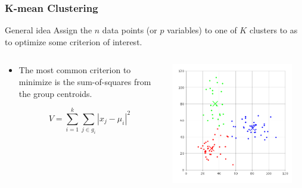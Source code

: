 \documentclass{beamer}
\begin{document}
\begin{frame}
\frametitle{K-mean Clustering}

\begin{block}{General idea}
Assign the $n$ data points (or $p$ variables) to one of $K$ clusters to as to optimize some criterion of interest.    
\end{block}

\begin{columns}
    
\begin{column}{5cm}
\begin{itemize}
\item The most common criterion to minimize is the sum-of-squares from the group centroids.

\[
V = \sum_{i=1}^k \sum_{j \in g_i}|x_j-\mu_i|^2
\]
\end{itemize}
\end{column}

\begin{column}{5.5cm}
\begin{center}
\includegraphics[width=0.9\textwidth]{k-means-simple.png}    
\end{center}
\end{column}

\end{columns}


\end{frame}
\end{document}
